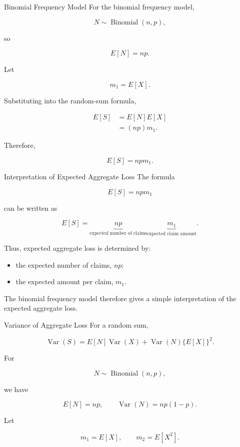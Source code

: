 \documentclass[
  ignorenonframetext,
  aspectratio=169,
]{beamer}
\providecommand{\tightlist}{%
  \setlength{\itemsep}{0pt}\setlength{\parskip}{0pt}}
\begin{document}
\begin{frame}{Binomial Frequency Model}
\protect{}\label{binomial-frequency-model}
For the binomial frequency model,

\[
N\sim\operatorname{Binomial}(n,p),
\]

so

\[
E[N]=np.
\]

Let

\[
m_1=E[X].
\]

Substituting into the random-sum formula,

\[
\begin{aligned}
E[S]
&=E[N]E[X]\\
&=(np)m_1.
\end{aligned}
\]

Therefore,

\[
\boxed{E[S]=npm_1}.
\]
\end{frame}

\begin{frame}{Interpretation of Expected Aggregate Loss}
\protect{}\label{interpretation-of-expected-aggregate-loss}
The formula

\[
E[S]=npm_1
\]

can be written as

\[
\boxed{
E[S]
=
\underbrace{np}_{\text{expected number of claims}}
\underbrace{m_1}_{\text{expected claim amount}}
}.
\]

Thus, expected aggregate loss is determined by:

\begin{itemize}
\tightlist
\item
  the expected number of claims, \(np\);
\item
  the expected amount per claim, \(m_1\).
\end{itemize}

The binomial frequency model therefore gives a simple interpretation of
the expected aggregate loss.
\end{frame}

\begin{frame}{Variance of Aggregate Loss}
\protect{}\label{variance-of-aggregate-loss}
For a random sum,

\[
\operatorname{Var}(S)
=
E[N]\operatorname{Var}(X)
+
\operatorname{Var}(N)\{E[X]\}^2.
\]

For

\[
N\sim\operatorname{Binomial}(n,p),
\]

we have

\[
E[N]=np,
\qquad
\operatorname{Var}(N)=np(1-p).
\]

Let

\[
m_1=E[X],
\qquad
m_2=E[X^2].
\]
\end{frame}
\end{document}

